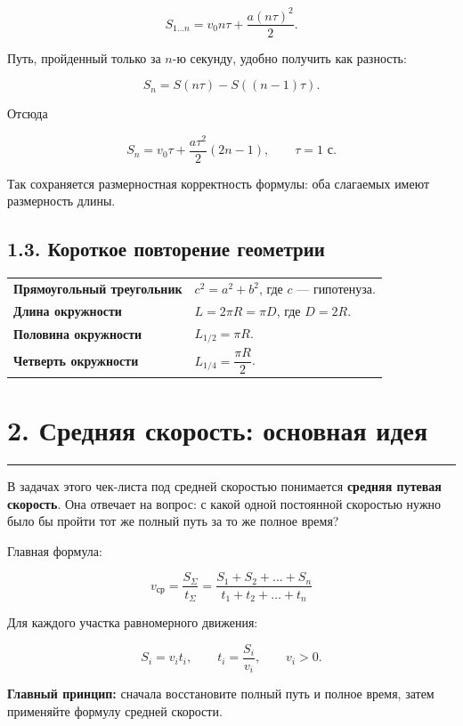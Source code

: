 \documentclass[a4paper,12pt]{article}
\newcommand{\sectionline}{%
  \vspace{0.15em}%
  \noindent\textcolor{accent}{\rule{\linewidth}{0.6pt}}%
  \vspace{0.3em}%
}
\begin{document}
\[
S_{1\ldots n}=v_0n\tau+\frac{a(n\tau)^2}{2}.
\]

Путь, пройденный только за $n$-ю секунду, удобно получить как разность:

\[
S_n=S(n\tau)-S((n-1)\tau).
\]

Отсюда

\[
\boxed{S_n=v_0\tau+\frac{a\tau^2}{2}(2n-1)},
\qquad \tau=1\text{ с}.
\]

Так сохраняется размерностная корректность формулы: оба слагаемых имеют размерность длины.

\subsection*{1.3. Короткое повторение геометрии}

\begin{tabularx}{\linewidth}{@{}>{\bfseries}l X@{}}
\toprule
Прямоугольный треугольник
&
$c^2=a^2+b^2$, где $c$ --- гипотенуза.
\\
Длина окружности
&
$L=2\pi R=\pi D$, где $D=2R$.
\\
Половина окружности
&
$L_{1/2}=\pi R$.
\\
Четверть окружности
&
$L_{1/4}=\dfrac{\pi R}{2}$.
\\
\bottomrule
\end{tabularx}


\section*{2. Средняя скорость: основная идея}
\sectionline

В задачах этого чек-листа под средней скоростью понимается \textbf{средняя путевая скорость}. Она отвечает на вопрос: с какой одной постоянной скоростью нужно было бы пройти тот же полный путь за то же полное время?

Главная формула:

\[
\boxed{
v_{\text{ср}}=
\frac{S_{\Sigma}}{t_{\Sigma}}=
\frac{S_1+S_2+\dots+S_n}{t_1+t_2+\dots+t_n}
}
\]

Для каждого участка равномерного движения:

\[
S_i=v_it_i,
\qquad
t_i=\frac{S_i}{v_i},
\qquad v_i>0.
\]

\textbf{Главный принцип:} сначала восстановите полный путь и полное время, затем применяйте формулу средней скорости.
\end{document}
